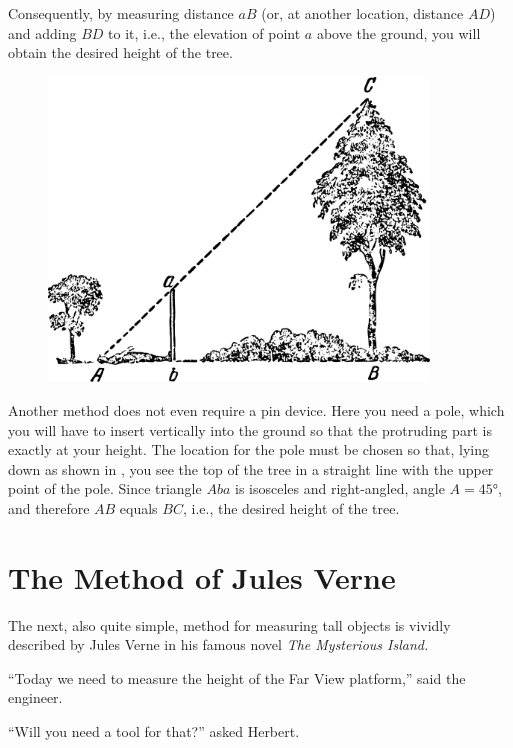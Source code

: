 Consequently, by measuring distance $aB$ (or, at another location, distance $AD$) and adding $BD$ to it, i.e., the elevation of point $a$ above the ground, you will obtain the desired height of the tree.

\begin{figure}[h!]
\centering
\includegraphics[width=0.9\textwidth]{figures/ch-01/fig-01-06.pdf}
\end{figure}

Another method does not even require a pin device. Here you need a pole, which you will have to insert vertically into the ground so that the protruding part is exactly at your height. The location for the pole must be chosen so that, lying down as shown in , you see the top of the tree in a straight line with the upper point of the pole. Since triangle $Aba$ is isosceles and right-angled, angle $A = \ang{45}$, and therefore $AB$ equals $BC$, i.e., the desired height of the tree.



\section{The Method of Jules Verne}
\label{sec-1.3}

The next, also quite simple, method for measuring tall objects is vividly described by Jules Verne in his famous novel \emph{The Mysterious Island.}

``Today we need to measure the height of the Far View platform,'' said the engineer.

``Will you need a tool for that?'' asked Herbert.

